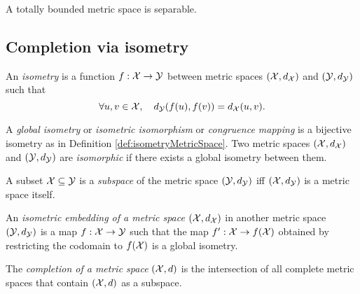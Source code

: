 \begin{lem}
  A totally bounded metric space is separable.
\end{lem}

\subsection{Completion via isometry}
\label{sec:compl-via-isom}

\begin{defn}
  \label{def:isometryMetricSpace}
  An \emph{isometry} is a function $f: {\cal X}\rightarrow{\cal Y}$
  between metric spaces $({\cal X}, d_{{\cal X}})$
  and $({\cal Y}, d_{{\cal Y}})$
  such that
  \begin{equation}
    \label{eq:isometryMetricSpace}
    \forall u,v\in {\cal X},\quad
    d_{{\cal Y}}(f(u),f(v)) = d_{{\cal X}}(u,v).
  \end{equation}
\end{defn}

\begin{defn}
  \label{def:isometricIsomorphism}
  A \emph{global isometry} or \emph{isometric isomorphism}
  or \emph{congruence mapping}
  is a bijective isometry
  as in Definition \ref{def:isometryMetricSpace}.
  Two metric spaces $({\cal X}, d_{{\cal X}})$
  and $({\cal Y}, d_{{\cal Y}})$
  are \emph{isomorphic} if there exists
  a global isometry between them.
\end{defn}

\begin{defn}
  \label{def:subspaceMetric}
  A subset ${\cal X}\subseteq {\cal Y}$
  is a \emph{subspace} of the metric space
  $({\cal Y}, d_{{\cal Y}})$ iff
  $({\cal X}, d_{{\cal Y}})$ is a metric space itself.
\end{defn}

\begin{defn}
  \label{def:isometricEmbedding}
  An \emph{isometric embedding of
  a metric space} $({\cal X}, d_{{\cal X}})$
  in another metric space
  $({\cal Y}, d_{{\cal Y}})$
  is a map $f: {\cal X}\rightarrow {\cal Y}$
  such that the map $f': {\cal X}\rightarrow f({\cal X})$
  obtained by restricting the codomain to $f({\cal X})$
  is a global isometry.
\end{defn}

\begin{defn}
  \label{def:completionMetricSpace}
  The \emph{completion of a metric space} $({\cal X}, d)$ 
  is the intersection of all complete metric spaces
  that contain $({\cal X}, d)$ as a subspace.
\end{defn}

